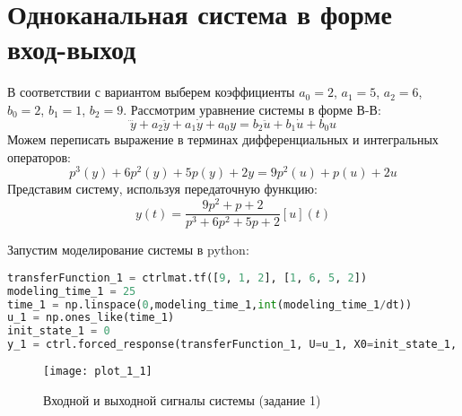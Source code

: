 \section{Одноканальная система в форме вход-выход}
В соответствии с вариантом выберем коэффициенты $a_0=2$, $a_1=5$, $a_2=6$, $b_0=2$, $b_1=1$, $b_2=9$.
Рассмотрим уравнение системы в форме В-В:
\begin{equation}
    \dddot{y} + a_2 \ddot{y} + a_1 \dot{y} + a_0 y = b_2 \ddot{u} + b_1 \dot{u} + b_0 u
\end{equation}
Можем переписать выражение в терминах дифференциальных и интегральных операторов:
\begin{equation*}
    p^3(y) + 6 p^2(y) + 5 p(y) + 2 y = 9 p^2(u) + p(u) + 2 u
\end{equation*}
Представим систему, используя передаточную функцию:
\begin{equation*}
    y(t) = \frac{9p^2 + p + 2}{p^3 + 6p^2 + 5p + 2}[u](t)
\end{equation*}

Запустим моделирование системы в python:

\begin{lstlisting}[language=Python]
transferFunction_1 = ctrlmat.tf([9, 1, 2], [1, 6, 5, 2])
modeling_time_1 = 25
time_1 = np.linspace(0,modeling_time_1,int(modeling_time_1/dt))
u_1 = np.ones_like(time_1)
init_state_1 = 0
y_1 = ctrl.forced_response(transferFunction_1, U=u_1, X0=init_state_1, T=time_1).outputs
\end{lstlisting}

\begin{figure}[h]
    \centering
    \texttt{[image: plot\_1\_1]}
    \caption{\label{fig:The-caption-1}Входной и выходной сигналы системы (задание 1)}
\end{figure}

\pagebreak

